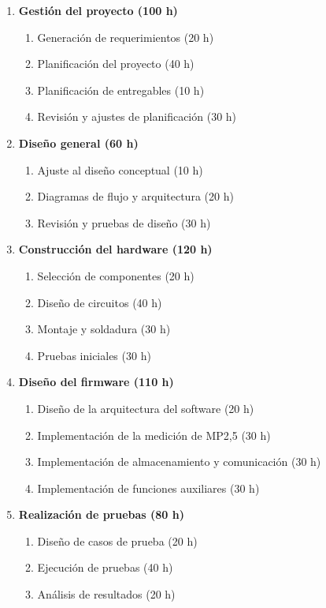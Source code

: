 \begin{enumerate}
	\item\textbf{ Gestión del proyecto (100 h)}
	\begin{enumerate}
		\item Generación de requerimientos (20 h)
		\item Planificación del proyecto (40 h)
		\item Planificación de entregables (10 h)
		\item Revisión y ajustes de planificación (30 h)
	\end{enumerate}
	
	\item\textbf{Diseño general (60 h)}
	\begin{enumerate}
		\item Ajuste al diseño conceptual (10 h)
		\item Diagramas de flujo y arquitectura (20 h)
		\item Revisión y pruebas de diseño (30 h)
	\end{enumerate}
	
	\item \textbf{Construcción del hardware (120 h)}
	\begin{enumerate}
		\item Selección de componentes (20 h)
		\item Diseño de circuitos (40 h)
		\item Montaje y soldadura (30 h)
		\item Pruebas iniciales (30 h)
	\end{enumerate}
	
	\item \textbf{Diseño del firmware (110 h)}
	\begin{enumerate}
		\item Diseño de la arquitectura del software (20 h)
		\item Implementación de la medición de MP2,5 (30 h)
		\item Implementación de almacenamiento y comunicación (30 h)
		\item Implementación de funciones auxiliares (30 h)
	\end{enumerate}
	
	\item \textbf{Realización de pruebas (80 h)}
	\begin{enumerate}
		\item Diseño de casos de prueba (20 h)
		\item Ejecución de pruebas (40 h)
		\item Análisis de resultados (20 h)
	\end{enumerate}
	

\end{enumerate}
